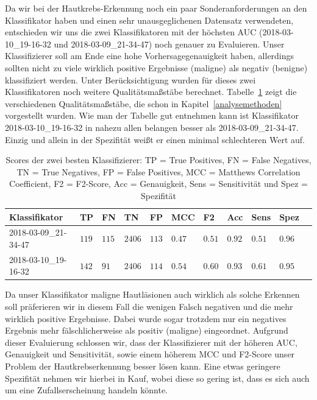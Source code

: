 Da wir bei der Hautkrebs-Erkennung noch ein paar Sonderanforderungen an den Klassifikator haben und einen sehr unausgeglichenen Datensatz verwendeten, entschieden wir uns die zwei Klassifikatoren mit der höchsten AUC (2018-03-10\_19-16-32 und 2018-03-09\_21-34-47) noch genauer zu Evaluieren. Unser Klassifizierer soll am Ende  eine hohe Vorhersagegenauigkeit haben, allerdings sollten nicht zu viele wirklich positive Ergebnisse (maligne) als negativ (benigne) klassifiziert werden. Unter Berücksichtigung wurden für dieses zwei Klassifikatoren noch weitere Qualitätsmaßstäbe berechnet. Tabelle~\ref{tab:scores} zeigt die verschiedenen Qualitätsmaßstäbe,  die schon in Kapitel~\ref{analysemethoden} vorgestellt wurden. Wie man der Tabelle gut entnehmen kann ist Klassifikator 2018-03-10\_19-16-32 in nahezu allen belangen besser als 2018-03-09\_21-34-47. Einzig und allein in der Spezifität weißt er einen minimal schlechteren Wert auf.

\begin{table}[htb!]
\begin{center}
\begin{tabular}{lllllllllll}
	\toprule
 	Klassifikator  & TP & FN & TN & FP & MCC & F2 & Acc & Sens & Spez\\
	\midrule
	2018-03-09\_21-34-47 & $119$ &	$115$ &	$2406$ &	$113$ &	$0.47$ &	$0.51$&	$0.92$ &	$0.51$ & $0.96$\\
    2018-03-10\_19-16-32 & $142$&	$91$ &	$2406$ &	$114$ &	$0.54$ 	&$0.60$	&$0.93$	&$0.61$&	$0.95$ \\
 \bottomrule
 \end{tabular}
 \end{center}
  \caption{Scores der zwei besten Klassifizierer: TP = True Positives, FN = False Negatives, TN = True Negatives, FP = False Positives, MCC = Matthews Correlation Coefficient, F2 = F2-Score, Acc = Genauigkeit, Sens = Sensitivität und Spez = Spezifität }
 \label{tab:scores}
 \end{table}
 
 Da unser Klassifikator maligne Hautläsionen auch wirklich als solche Erkennen soll präferieren wir in diesem Fall die wenigen Falsch negativen und die mehr wirklich positive Ergebnisse. Dabei wurde sogar trotzdem nur ein negatives Ergebnis mehr fälschlicherweise als positiv (maligne) eingeordnet. Aufgrund dieser Evaluierung schlossen wir, dass der Klassifizierer mit der höheren AUC, Genauigkeit und Sensitivität, sowie einem  höherem MCC und F2-Score unser Problem der Hautkrebserkennung besser lösen kann. Eine etwas geringere Spezifität nehmen wir hierbei in Kauf, wobei diese so gering ist, dass es sich auch um eine Zufallserscheinung handeln könnte.
 
